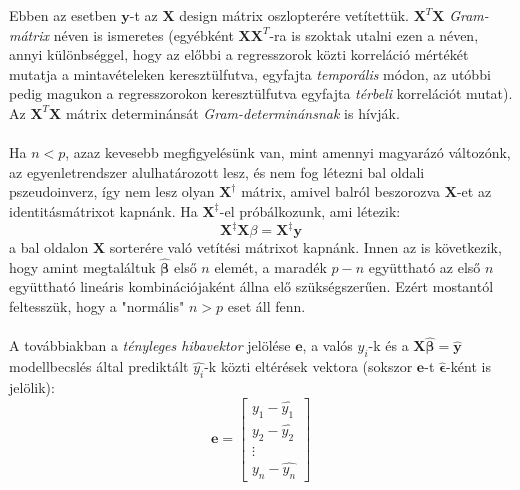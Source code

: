 \documentclass[14p]{report}
\def\pmb{\boldsymbol}
\def\ebeta{\hat{\pmb{\beta}}}
\def\e{\epsilon}
\begin{document}
	\begin{center}
	\end{center}
	Ebben az esetben $\pmb{y}$-t az $\pmb{X}$ design mátrix oszlopterére vetítettük. $\pmb{X}^T\pmb{X}$ \emph{Gram-mátrix} néven is ismeretes (egyébként $\pmb{X}\pmb{X}^T$-ra is szoktak utalni ezen a néven, annyi különbséggel, hogy az előbbi a regresszorok közti korreláció mértékét mutatja a mintavételeken keresztülfutva, egyfajta \emph{temporális} módon, az utóbbi pedig magukon a regresszorokon keresztülfutva egyfajta \emph{térbeli} korrelációt mutat). Az $\pmb{X}^T\pmb{X}$ mátrix determinánsát \emph{Gram-determinánsnak} is hívják.
	\\
	\\
	Ha $n < p$, azaz kevesebb megfigyelésünk van, mint amennyi magyarázó változónk, az egyenletrendszer alulhatározott lesz, és nem fog létezni bal oldali pszeudoinverz, így nem lesz olyan $\pmb{X}^{\dagger}$ mátrix, amivel balról beszorozva $\pmb{X}$-et az identitásmátrixot kapnánk. Ha $\pmb{X}^{\ddagger}$-el próbálkozunk, ami létezik:
	\[
		\pmb{X}^{\ddagger}\pmb{X}\beta = \pmb{X}^{\ddagger}\pmb{y}
	\] 
	a bal oldalon $\pmb{X}$ sorterére való vetítési mátrixot kapnánk. Innen az is következik, hogy amint megtaláltuk $\ebeta$ első $n$ elemét, a maradék $p-n$ együttható az első $n$ együttható lineáris kombinációjaként állna elő szükségszerűen. Ezért mostantól feltesszük, hogy a "normális" $n > p$ eset áll fenn. 
	\\
	\\
	A továbbiakban a \emph{tényleges hibavektor} jelölése 
	$\pmb{e}$, a valós $y_i$-k és a $\pmb{X}\ebeta = \hat{\pmb{y}}$ modellbecslés által prediktált $\hat{y_i}$-k közti eltérések vektora (sokszor $\pmb{e}$-t $\widehat{\pmb{\e}}$-ként is jelölik):
	\[
	\pmb{e} =
	\begin{bmatrix}
		y_1 - \hat{y_1} \\
		y_2  - \hat{y_2} \\
		\vdots \\
		y_n - \hat{y_n}
	\end{bmatrix}
	\]
\end{document}
